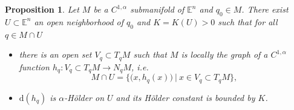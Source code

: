 \documentclass[11pt,reqno,a4paper]{article}%
\newtheorem{lemma}[theorem]{\sc{Lemma}}
\newtheorem{proposition}[theorem]{Proposition}
\theoremstyle{definition}
\theoremstyle{remark}
\renewcommand{\d}{\mathrm{d}}
\newcommand{\E}{\mathbb{E}}
\renewcommand{\d}{\mathrm{d}}
\begin{document}

\begin{proposition} \label{prop: graph_constant_holder_global}
    Let $M$ be a $C^{1, \alpha}$ submanifold of $\E^n$ and $q_0 \in M$.
    There exist $U \subset \E^n$ an open neighborhood of $q_0$ and $K  = K(U) > 0$ such that for all $q \in  M \cap U$
    \begin{itemize}
        \item[(1)] there is an open set $V_q \subset T_q M$ such that $M$ is locally the graph of a $C^{1, \alpha}$ function $h_{q} : V_q \subset T_{q}M \to N_{q}M$, \textit{i.e.} 
        $$ M \cap U = \big\{ \big(x , h_{q}(x)\big) ~| ~ x \in V_q  \subset T_q M\big\}, $$
        \item[(2)] $\d (h_{q})$ is $\alpha$-Hölder on $U$ and its Hölder constant is bounded by $K$.
    \end{itemize}
\end{proposition}
\end{document}
